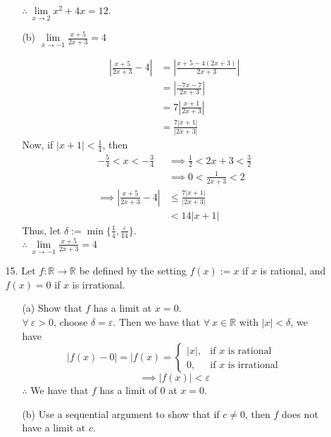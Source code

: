 \documentclass[12pt,letterpaper]{article}
\newcommand{\abs}[1]{\left\lvert #1 \right\rvert}
\newcommand{\R}{\mathbb{R}}
\theoremstyle{case}
\theoremstyle{definition}
\begin{document}
\begin{enumerate}
\begin{enumerate}
\begin{enumerate}
				$\therefore\ \lim\limits_{x \to 2} x^2+4x=12$.
				
				\item[(b)] $\lim\limits_{x \to -1} \frac{x+5}{2x+3} = 4$
				
				\begin{align*}
					\abs{\frac{x+5}{2x+3}-4} &= \abs{\frac{x+5-4(2x+3)}{2x+3}} \\
					&=\abs{\frac{-7x-7}{2x+3}} \\
					&= 7 \abs{\frac{x+1}{2x+3}} \\
					&=\frac{7|x+1|}{|2x+3|}
				\end{align*}
				Now, if $|x+1|<\frac{1}{4}$, then
				\begin{align*}
					-\frac{5}{4}<x<-\frac{3}{4} &\implies \frac{1}{2}<2x+3<\frac{3}{2} \\
					&\implies 0<\frac{1}{2x+3}<2 \\
					\implies \abs{\frac{x+5}{2x+3}-4} &\leq \frac{7|x+1|}{|2x+3|} \\
					&< 14|x+1|
				\end{align*}
				Thus, let $\delta:=\min \{\frac{1}{4}, \frac{\varepsilon}{14}\}$.\\
				
				$\therefore\ \lim\limits_{x \to -1} \frac{x+5}{2x+3}=4$
			\end{enumerate}
		
			\item[15.] Let $f:\R \to \R$ be defined by the setting $f(x):=x$ if $x$ is rational, and $f(x)=0$ if $x$ is irrational.
			\begin{enumerate}
				\item[(a)] Show that $f$ has a limit at $x=0$.\\
				
				$\forall\ \varepsilon > 0$, choose $\delta = \varepsilon$. Then we have that $\forall\ x \in \R$ with $|x|<\delta$, we have
				\[|f(x)-0|=|f(x)=\begin{cases}
				|x|, & \text{if } x \text{ is rational} \\
				0, & \text{if } x \text{ is irrational}
				\end{cases}\]
				\[\implies |f(x)|<\varepsilon\]
				$\therefore$ We have that $f$ has a limit of $0$ at $x=0$.
				
				\item[(b)] Use a sequential argument to show that if $c \neq 0$, then $f$ does not have a limit at $c$.\\
				

\end{enumerate}
\end{enumerate}
\end{enumerate}
\end{document}
